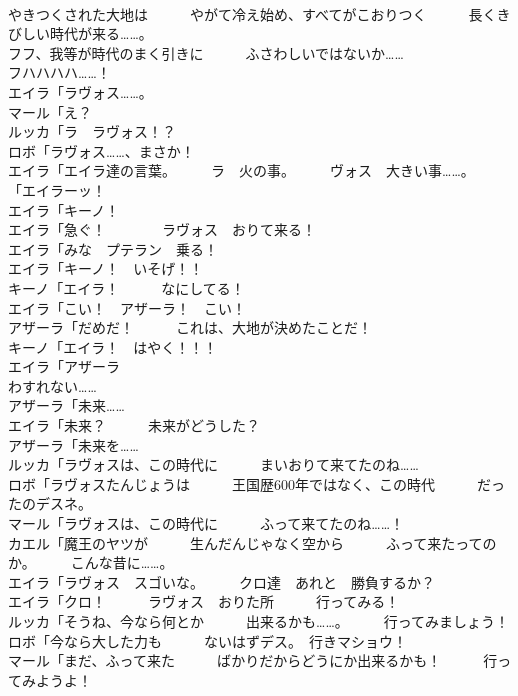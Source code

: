 \documentclass[8pt]{extreport}
\begin{document}
\begin{CJK}{UTF8}{min}
\\	やきつくされた大地は　　　やがて冷え始め、すべてがこおりつく　　　長くきびしい時代が来る……。	
\\	フフ、我等が時代のまく引きに　　　ふさわしいではないか……	
\\	フハハハハ……！	
\\	エイラ「ラヴォス……。	
\\	マール「え？	
\\	ルッカ「ラ　ラヴォス！？	
\\	ロボ「ラヴォス……、まさか！	
\\	エイラ「エイラ達の言葉。　　　ラ　火の事。　　　ヴォス　大きい事……。	
\\	「エイラーッ！	
\\	エイラ「キーノ！	
\\	エイラ「急ぐ！　　　　ラヴォス　おりて来る！	
\\	エイラ「みな　プテラン　乗る！	
\\	エイラ「キーノ！　いそげ！！	
\\	キーノ「エイラ！　　　なにしてる！	
\\	エイラ「こい！　アザーラ！　こい！	
\\	アザーラ「だめだ！　　　これは、大地が決めたことだ！	
\\	キーノ「エイラ！　はやく！！！	
\\	エイラ「アザーラ	
\\	わすれない……	
\\	アザーラ「未来……	
\\	エイラ「未来？　　　未来がどうした？	
\\	アザーラ「未来を……	
\\	ルッカ「ラヴォスは、この時代に　　　まいおりて来てたのね……	
\\	ロボ「ラヴォスたんじょうは　　　王国歴600年ではなく、この時代　　　だったのデスネ。	
\\	マール「ラヴォスは、この時代に　　　ふって来てたのね……！	
\\	カエル「魔王のヤツが　　　生んだんじゃなく空から　　　ふって来たってのか。　　　こんな昔に……。	
\\	エイラ「ラヴォス　スゴいな。　　　クロ達　あれと　勝負するか？	
\\	エイラ「クロ！　　　ラヴォス　おりた所　　　行ってみる！	
\\	ルッカ「そうね、今なら何とか　　　出来るかも……。　　　行ってみましょう！	
\\	ロボ「今なら大した力も　　　ないはずデス。　行きマショウ！	
\\	マール「まだ、ふって来た　　　ばかりだからどうにか出来るかも！　　　行ってみようよ！	

\end{CJK}
\end{document}
